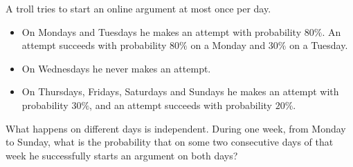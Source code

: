 A troll tries to start an online argument at most once per day.
\begin{itemize}
\item On Mondays and Tuesdays he makes an attempt with probability $80\%$. An attempt succeeds with probability $80\%$ on a Monday and $30\%$ on a Tuesday.
\item On Wednesdays he never makes an attempt.
\item On Thursdays, Fridays, Saturdays and Sundays he makes an attempt with probability $30\%$, and an attempt succeeds with probability $20\%$.
\end{itemize}
What happens on different days is independent. During one week, from Monday to Sunday, what is the probability that on some two consecutive days of that week he successfully starts an argument on both days?
